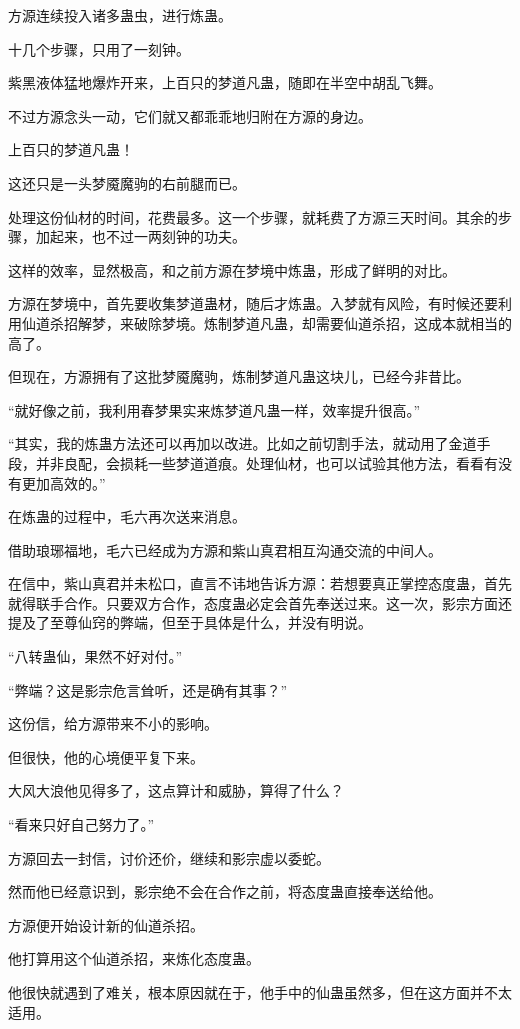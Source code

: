 \begin{this_body}
方源连续投入诸多蛊虫，进行炼蛊。

十几个步骤，只用了一刻钟。

紫黑液体猛地爆炸开来，上百只的梦道凡蛊，随即在半空中胡乱飞舞。

不过方源念头一动，它们就又都乖乖地归附在方源的身边。

上百只的梦道凡蛊！

这还只是一头梦魇魔驹的右前腿而已。

处理这份仙材的时间，花费最多。这一个步骤，就耗费了方源三天时间。其余的步骤，加起来，也不过一两刻钟的功夫。

这样的效率，显然极高，和之前方源在梦境中炼蛊，形成了鲜明的对比。

方源在梦境中，首先要收集梦道蛊材，随后才炼蛊。入梦就有风险，有时候还要利用仙道杀招解梦，来破除梦境。炼制梦道凡蛊，却需要仙道杀招，这成本就相当的高了。

但现在，方源拥有了这批梦魇魔驹，炼制梦道凡蛊这块儿，已经今非昔比。

“就好像之前，我利用春梦果实来炼梦道凡蛊一样，效率提升很高。”

“其实，我的炼蛊方法还可以再加以改进。比如之前切割手法，就动用了金道手段，并非良配，会损耗一些梦道道痕。处理仙材，也可以试验其他方法，看看有没有更加高效的。”

在炼蛊的过程中，毛六再次送来消息。

借助琅琊福地，毛六已经成为方源和紫山真君相互沟通交流的中间人。

在信中，紫山真君并未松口，直言不讳地告诉方源：若想要真正掌控态度蛊，首先就得联手合作。只要双方合作，态度蛊必定会首先奉送过来。这一次，影宗方面还提及了至尊仙窍的弊端，但至于具体是什么，并没有明说。

“八转蛊仙，果然不好对付。”

“弊端？这是影宗危言耸听，还是确有其事？”

这份信，给方源带来不小的影响。

但很快，他的心境便平复下来。

大风大浪他见得多了，这点算计和威胁，算得了什么？

“看来只好自己努力了。”

方源回去一封信，讨价还价，继续和影宗虚以委蛇。

然而他已经意识到，影宗绝不会在合作之前，将态度蛊直接奉送给他。

方源便开始设计新的仙道杀招。

他打算用这个仙道杀招，来炼化态度蛊。

他很快就遇到了难关，根本原因就在于，他手中的仙蛊虽然多，但在这方面并不太适用。


\end{this_body}
